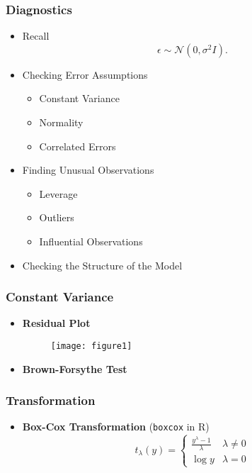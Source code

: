 \documentclass[serif,mathserif,professionalfont]{beamer}
\begin{document}
\begin{frame}
	
	\frametitle{Diagnostics}
	
	\begin{itemize}
		\item Recall
		$$ \epsilon \sim \mathcal{N} \left(0, \sigma^2 I \right). $$
		\item Checking Error Assumptions
		\begin{itemize}
			\item Constant Variance
			\item Normality
			\item Correlated Errors
		\end{itemize}
		\item Finding Unusual Observations
		\begin{itemize}
			\item Leverage
			\item Outliers
			\item Influential Observations
		\end{itemize}
		\item Checking the Structure of the Model
	\end{itemize}
	
	
\end{frame}


\begin{frame}
	
	\frametitle{Constant Variance}
	
	\begin{itemize}
		\item \textbf{Residual Plot}
		\begin{figure}
			\texttt{[image: figure1]}
		\end{figure}
		\item \textbf{Brown-Forsythe Test}
	\end{itemize}


	
	
\end{frame}


\begin{frame}
	
	\frametitle{Transformation}
	
	\begin{itemize}
		\item \textbf{Box-Cox Transformation} (\texttt{boxcox} in R)
		\begin{equation}
			t_{\lambda}(y) =
			\begin{cases}
			\frac{y^\lambda - 1}{\lambda} & \lambda \neq 0 \\
			\log y & \lambda = 0
			\nonumber
			\end{cases}
		\end{equation}
	\end{itemize}
	
	
	
	
\end{frame}
\end{document}
